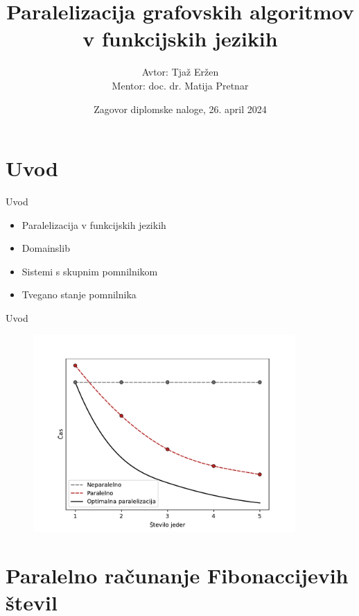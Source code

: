 \documentclass{beamer}
\title[Paralelizacija grafovskih algoritmov v funkcijskih jezikih]
{Paralelizacija grafovskih algoritmov v funkcijskih jezikih}
\author[Avtor: Tjaž Eržen, Mentor: doc. dr. Matija Pretnar]
{Avtor: Tjaž Eržen\\Mentor: doc. dr. Matija Pretnar}
\date[24. april 2024]
{Zagovor diplomske naloge, 26. april 2024}
\begin{document}
\section{Uvod}

\begin{frame}
  \titlepage
\end{frame}

\begin{frame}
  \tableofcontents
\end{frame}


\begin{frame}{Uvod}
    \begin{itemize}
        \item Paralelizacija v funkcijskih jezikih
        \item Domainslib
        \item Sistemi s skupnim pomnilnikom
        \item Tvegano stanje pomnilnika
    \end{itemize}
\end{frame}

\begin{frame}{Uvod}
  \begin{figure}
    \includegraphics[width=10cm]{slike/cilj-casovne-zahtevnosti-paralelizacije.pdf}
  \end{figure}
\end{frame}

\section{Paralelno računanje Fibonaccijevih števil}
\end{document}
